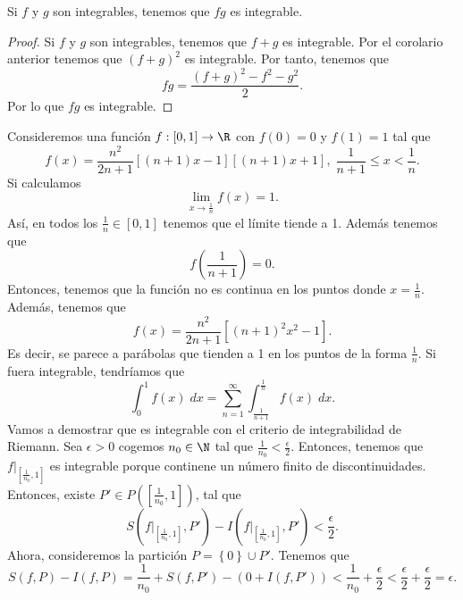 \begin{fcolorary}[]
\normalfont Si $\displaystyle f $ y $\displaystyle g $ son integrables, tenemos que $\displaystyle fg $ es integrable.
\end{fcolorary}
\begin{proof}
Si $\displaystyle f $ y $\displaystyle g $ son integrables, tenemos que $\displaystyle f + g $ es integrable. Por el corolario anterior tenemos que $\displaystyle \left(f+g\right)^{2} $ es integrable. Por tanto, tenemos que 
\[ fg = \frac{\left(f+g\right)^{2}-f^{2}-g^{2}}{2} .\]
Por lo que $\displaystyle fg $ es integrable.
\end{proof}
\begin{eg}
	\normalfont Consideremos una función $\displaystyle f : \left[0,1\right] \to \R $ con $\displaystyle f\left(0\right) = 0 $ y $\displaystyle f\left(1\right) = 1 $ tal que
	\[ f\left(x\right) = \frac{n^{2}}{2n+1}\left[\left(n+1\right)x-1\right] \left[\left(n+1\right)x + 1\right] , \; \frac{1}{n+1} \leq x < \frac{1}{n} .\]
Si calculamos
\[\lim_{x \to \frac{1}{n}}f\left(x\right) = 1 .\]
Así, en todos los $\displaystyle \frac{1}{n} \in \left[0,1\right]  $ tenemos que el límite tiende a 1. Además tenemos que 
\[f\left(\frac{1}{n+1}\right) = 0 .\]
Entonces, tenemos que la función no es continua en los puntos donde $\displaystyle x = \frac{1}{n} $. Además, tenemos que
\[ f\left(x\right) = \frac{n^{2}}{2n+1}\left[\left(n+1\right)^{2}x^{2}-1\right]  .\]
Es decir, se parece a parábolas que tienden a 1 en los puntos de la forma $\displaystyle \frac{1}{n} $. Si fuera integrable, tendríamos que
\[\int^{1}_{0} f\left(x\right) \; dx = \sum^{\infty}_{n=1}\int^{\frac{1}{n}}_{\frac{1}{n+1}} f\left(x\right) \; dx .\]
Vamos a demostrar que es integrable con el criterio de integrabilidad de Riemann. Sea $\displaystyle \epsilon > 0 $ cogemos $\displaystyle n_{0} \in \N $ tal que $\displaystyle \frac{1}{n_{0}} < \frac{\epsilon }{2} $. Entonces, tenemos que $\displaystyle f|_{\left[\frac{1}{n_{0}}, 1\right] } $ es integrable porque continene un número finito de discontinuidades. Entonces, existe $\displaystyle P' \in P\left(\left[\frac{1}{n_{0}},1\right] \right) $, tal que 
\[S\left(f|_{\left[\frac{1}{n_{0}}, 1\right] }, P'\right) - I\left(f|_{\left[\frac{1}{n_{0}}, 1\right] },P'\right) < \frac{\epsilon }{2}.\]
Ahora, consideremos la partición $\displaystyle P = \left\{ 0\right\} \cup P' $. Tenemos que
\[ S\left(f,P\right)-I\left(f,P\right) = \frac{1}{n_{0}} + S\left(f,P'\right) - \left(0 + I\left(f,P'\right)\right) < \frac{1}{n_{0}} + \frac{\epsilon }{2} < \frac{\epsilon }{2} + \frac{\epsilon }{2} = \epsilon .\]
\end{eg}
